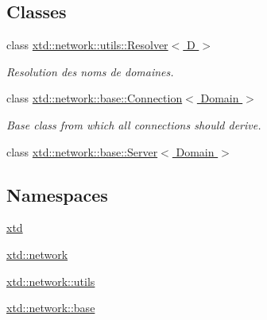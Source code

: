 \subsection*{Classes}
\begin{DoxyCompactItemize}
\item 
class \hyperlink{classxtd_1_1network_1_1utils_1_1Resolver}{xtd\+::network\+::utils\+::\+Resolver$<$ D $>$}
\begin{DoxyCompactList}\small\item\em Resolution des noms de domaines. \end{DoxyCompactList}\item 
class \hyperlink{classxtd_1_1network_1_1base_1_1Connection}{xtd\+::network\+::base\+::\+Connection$<$ Domain $>$}
\begin{DoxyCompactList}\small\item\em Base class from which all connections should derive. \end{DoxyCompactList}\item 
class \hyperlink{classxtd_1_1network_1_1base_1_1Server}{xtd\+::network\+::base\+::\+Server$<$ Domain $>$}
\end{DoxyCompactItemize}
\subsection*{Namespaces}
\begin{DoxyCompactItemize}
\item 
 \hyperlink{namespacextd}{xtd}
\item 
 \hyperlink{namespacextd_1_1network}{xtd\+::network}
\item 
 \hyperlink{namespacextd_1_1network_1_1utils}{xtd\+::network\+::utils}
\item 
 \hyperlink{namespacextd_1_1network_1_1base}{xtd\+::network\+::base}
\end{DoxyCompactItemize}
